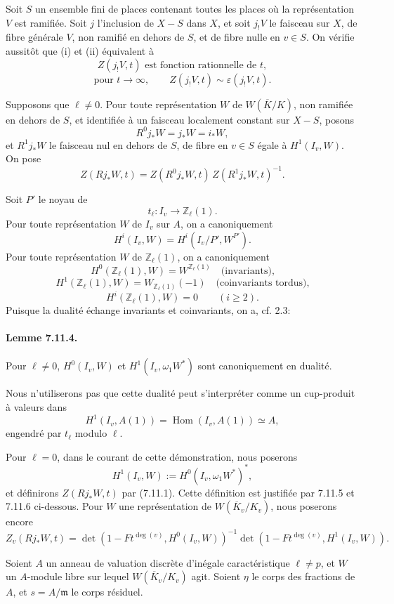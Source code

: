 \documentclass[10pt]{article}
\newcommand{\Hom}{\operatorname{Hom}}
\providecommand{\Hom}{\operatorname{Hom}}
\providecommand{\Hom}{\operatorname{Hom}}
\providecommand{\Hom}{\operatorname{Hom}}
\begin{document}
Soit \(S\) un ensemble fini de places contenant toutes les places où la représentation \(V\) est ramifiée. Soit \(j\) l'inclusion de \(X-S\) dans \(X\), et soit \(j_!V\) le faisceau sur \(X\), de fibre générale \(V\), non ramifié en dehors de \(S\), et de fibre nulle en \(v\in S\). On vérifie aussitôt que (i) et (ii) équivalent à
\[
\tag{i'}
Z(j_!V,t)\text{ est fonction rationnelle de }t,
\]
\[
\tag{ii'}
\text{pour }t\to\infty,\qquad Z(j_!V,t)\sim\varepsilon(j_!V,t).
\]

Supposons que \(\ell\ne0\). Pour toute représentation \(W\) de \(W(\overline K/K)\), non ramifiée en dehors de \(S\), et identifiée à un faisceau localement constant sur \(X-S\), posons
\[
R^0j_*W=j_*W=i_*W,
\]
et \(R^1j_*W\) le faisceau nul en dehors de \(S\), de fibre en \(v\in S\) égale à \(H^1(I_v,W)\). On pose
\[
\tag{7.11.1}
Z(Rj_*W,t)=Z(R^0j_*W,t)\,Z(R^1j_*W,t)^{-1}.
\]

Soit \(P'\) le noyau de
\[
t_\ell:I_v\longrightarrow \mathbb Z_\ell(1).
\]
Pour toute représentation \(W\) de \(I_v\) sur \(A\), on a canoniquement
\[
\tag{7.11.2}
H^i(I_v,W)=H^i(I_v/P',W^{P'}).
\]
Pour toute représentation \(W\) de \(\mathbb Z_\ell(1)\), on a canoniquement
\[
\tag{7.11.3}
H^0(\mathbb Z_\ell(1),W)=W^{\mathbb Z_\ell(1)}
\quad\text{(invariants),}
\]
\[
H^1(\mathbb Z_\ell(1),W)=W_{\mathbb Z_\ell(1)}(-1)
\quad\text{(coinvariants tordus),}
\]
\[
H^i(\mathbb Z_\ell(1),W)=0\qquad(i\ge2).
\]
Puisque la dualité échange invariants et coinvariants, on a, cf. 2.3:

\paragraph{Lemme 7.11.4.} Pour \(\ell\ne0\), \(H^0(I_v,W)\) et \(H^1(I_v,\omega_1W^*)\) sont canoniquement en dualité.

Nous n'utiliserons pas que cette dualité peut s'interpréter comme un cup-produit à valeurs dans
\[
H^1(I_v,A(1))=\Hom(I_v,A(1))\simeq A,
\]
engendré par \(t_\ell\) modulo \(\ell\).

Pour \(\ell=0\), dans le courant de cette démonstration, nous poserons
\[
H^1(I_v,W):=H^0(I_v,\omega_1W^*)^*,
\]
et définirons \(Z(Rj_*W,t)\) par (7.11.1). Cette définition est justifiée par 7.11.5 et 7.11.6 ci-dessous. Pour \(W\) une représentation de \(W(\overline K_v/K_v)\), nous poserons encore
\[
Z_v(Rj_*W,t)=
\det(1-Ft^{\deg(v)},H^0(I_v,W))^{-1}
\det(1-Ft^{\deg(v)},H^1(I_v,W)).
\]

Soient \(A\) un anneau de valuation discrète d'inégale caractéristique \(\ell\ne p\), et \(W\) un \(A\)-module libre sur lequel \(W(\overline K_v/K_v)\) agit. Soient \(\eta\) le corps des fractions de \(A\), et \(s=A/\mathfrak m\) le corps résiduel.
\end{document}
